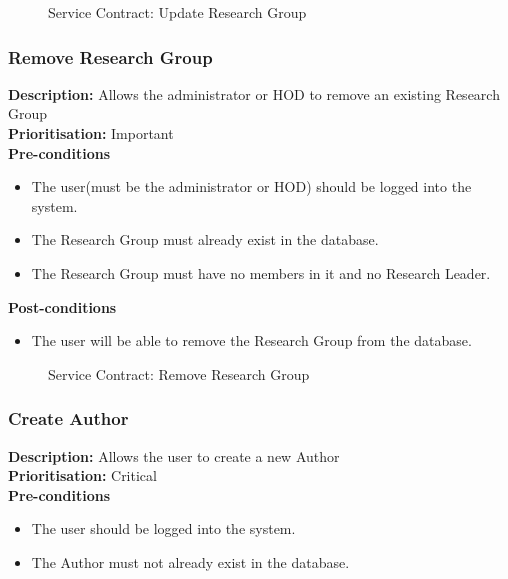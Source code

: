 \documentclass[a4paper]{article}
\begin{document}
    	    	\begin{figure}[H]
    	    		\centering
    	    		\caption{Service Contract: Update Research Group}
    	    	\end{figure}
    	
    	\pagebreak
    \subsubsection{Remove Research Group}
    	\textbf{Description:} Allows the administrator or HOD to remove an existing Research Group\\
    	\textbf{Prioritisation:} Important\\
    	
    	\textbf{Pre-conditions}
    	 \begin{itemize}
    		\item The user(must be the administrator or HOD) should be logged into the system.
    		\item The Research Group must already exist in the database.
    		\item The Research Group must have no members in it and no Research Leader.
    	\end{itemize}
    	
    	\textbf{Post-conditions}
    	 \begin{itemize}
    		\item The user will be able to remove the Research Group from the database.
    	\end{itemize}
    	
    	    	\begin{figure}[H]
    	    		\centering
    	    		\caption{Service Contract: Remove Research Group}
    	    	\end{figure}
    	
    	\pagebreak
    \subsubsection{Create Author}
    	\textbf{Description:} Allows the user to create a new Author\\
    	\textbf{Prioritisation:} Critical\\
    	
    	\textbf{Pre-conditions}
    	 \begin{itemize}
    		\item The user should be logged into the system.
    		\item The Author must not already exist in the database.
    	\end{itemize}
    	
\end{document}
